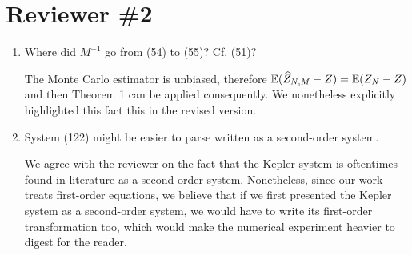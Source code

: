 \documentclass[10pt]{article}
\begin{document}
\section{Reviewer \#2} 
\begin{enumerate}
	\item 
	\begin{itquote}
		Where did $M^{-1}$ go from (54) to (55)? Cf. (51)?
	\end{itquote}
	The Monte Carlo estimator is unbiased, therefore $\operatorname{\mathbb{E}}(\widehat Z_{N,M} - Z) = \operatorname{\mathbb{E}}(Z_N - Z)$ and then Theorem 1 can be applied consequently. We nonetheless explicitly highlighted this fact this in the revised version.
	\item 
	\begin{itquote}
		System (122) might be easier to parse written as a second-order system.
	\end{itquote}
	We agree with the reviewer on the fact that the Kepler system is oftentimes found in literature as a second-order system. Nonetheless, since our work treats first-order equations, we believe that if we first presented the Kepler system as a second-order system, we would have to write its first-order transformation too, which would make the numerical experiment heavier to digest for the reader.  
\end{enumerate}



\end{document}
